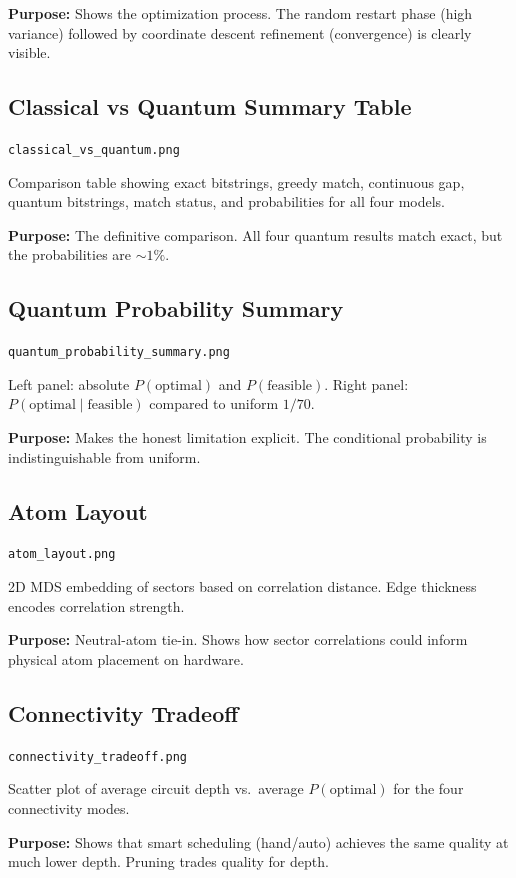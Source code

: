 \documentclass[12pt, a4paper]{article}
\begin{document}
\textbf{Purpose:} Shows the optimization process. The random restart phase
(high variance) followed by coordinate descent refinement (convergence) is
clearly visible.

\subsection{Classical vs Quantum Summary Table}
\texttt{classical\_vs\_quantum.png}

Comparison table showing exact bitstrings, greedy match, continuous gap,
quantum bitstrings, match status, and probabilities for all four models.

\textbf{Purpose:} The definitive comparison. All four quantum results match
exact, but the probabilities are $\sim 1\%$.

\subsection{Quantum Probability Summary}
\texttt{quantum\_probability\_summary.png}

Left panel: absolute $P(\text{optimal})$ and $P(\text{feasible})$.
Right panel: $P(\text{optimal} \mid \text{feasible})$ compared to uniform $1/70$.

\textbf{Purpose:} Makes the honest limitation explicit. The conditional
probability is indistinguishable from uniform.

\subsection{Atom Layout}
\texttt{atom\_layout.png}

2D MDS embedding of sectors based on correlation distance. Edge thickness
encodes correlation strength.

\textbf{Purpose:} Neutral-atom tie-in. Shows how sector correlations could
inform physical atom placement on hardware.

\subsection{Connectivity Tradeoff}
\texttt{connectivity\_tradeoff.png}

Scatter plot of average circuit depth vs.\ average $P(\text{optimal})$ for the
four connectivity modes.

\textbf{Purpose:} Shows that smart scheduling (hand/auto) achieves the same
quality at much lower depth. Pruning trades quality for depth.
\end{document}

